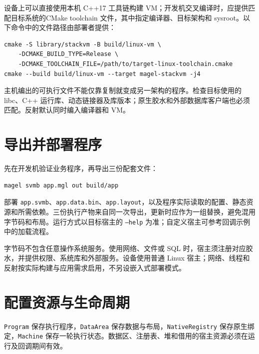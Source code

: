 设备上可以直接使用本机 C++17 工具链构建 VM；开发机交叉编译时，应提供匹配目标系统的CMake toolchain 文件，其中指定编译器、目标架构和 sysroot。以下命令中的文件路径由部署者提供：

\par
\medskip
\begin{lstlisting}[style=sh]
cmake -S library/stackvm -B build/linux-vm \
    -DCMAKE_BUILD_TYPE=Release \
    -DCMAKE_TOOLCHAIN_FILE=/path/to/target-linux-toolchain.cmake
cmake --build build/linux-vm --target magel-stackvm -j4
\end{lstlisting}
\par
\medskip

主机编出的可执行文件不能仅靠复制就变成另一架构的程序。检查目标使用的 libc、C++ 运行库、动态链接器及库版本；原生胶水和外部数据库客户端也必须匹配。反射默认同时编入编译器和 VM。

\section{导出并部署程序}

先在开发机验证业务程序，再导出三份配套文件：

\par
\medskip
\begin{lstlisting}[style=sh]
magel svmb app.mgl out build/app
\end{lstlisting}
\par
\medskip

部署 \texttt{app.\allowbreak{}svmb}、\texttt{app.\allowbreak{}data.\allowbreak{}bin}、\texttt{app.\allowbreak{}layout}，以及程序实际读取的配置、静态资源和所需依赖。三份执行产物来自同一次导出，更新时应作为一组替换，避免混用字节码和布局。运行方式以目标宿主的 \texttt{--help} 为准；自定义宿主可参考回调示例中的加载流程。

字节码不包含任意操作系统服务。使用网络、文件或 SQL 时，宿主须注册对应胶水，并提供权限、系统库和外部服务。设备使用普通 Linux 宿主；网络、线程和反射按实际构建与应用需求启用，不另设嵌入式部署模式。

\section{配置资源与生命周期}

\texttt{Program} 保存执行程序，\texttt{Data\allowbreak{}Area} 保存数据与布局，\texttt{Native\allowbreak{}Registry} 保存原生绑定，\texttt{Machine} 保存一轮执行状态。数据区、注册表、堆和借用的宿主资源必须在运行及回调期间有效。

